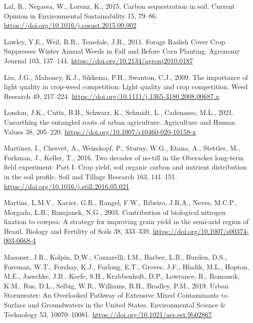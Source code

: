 \documentclass[
  12pt,
]{article}
\newlength{\cslhangindent}
\newlength{\cslentryspacingunit} %
\newenvironment{CSLReferences}[2] %
 {%
  \setlength{\parindent}{0pt}
  \ifodd #1
  \let\oldpar\par
  \def\par{\hangindent=\cslhangindent\oldpar}
  \fi
  \setlength{\parskip}{#2\cslentryspacingunit}
 }%
 {}
\begin{document}
\begin{CSLReferences}{1}{0}
\leavevmode{}%
Lal, R., Negassa, W., Lorenz, K., 2015. Carbon sequestration in soil. Current Opinion in Environmental Sustainability 15, 79--86. \url{https://doi.org/10.1016/j.cosust.2015.09.002}

\leavevmode{}%
Lawley, Y.E., Weil, R.R., Teasdale, J.R., 2011. Forage {Radish Cover Crop Suppresses Winter Annual Weeds} in {Fall} and {Before Corn Planting}. Agronomy Journal 103, 137--144. \url{https://doi.org/10.2134/agronj2010.0187}

\leavevmode{}%
Liu, J.G., Mahoney, K.J., Sikkema, P.H., Swanton, C.J., 2009. The importance of light quality in crop-weed competition: {Light} quality and crop competition. Weed Research 49, 217--224. \url{https://doi.org/10.1111/j.1365-3180.2008.00687.x}

\leavevmode{}%
London, J.K., Cutts, B.B., Schwarz, K., Schmidt, L., Cadenasso, M.L., 2021. Unearthing the entangled roots of urban agriculture. Agriculture and Human Values 38, 205--220. \url{https://doi.org/10.1007/s10460-020-10158-x}

\leavevmode{}%
Martínez, I., Chervet, A., Weisskopf, P., Sturny, W.G., Etana, A., Stettler, M., Forkman, J., Keller, T., 2016. Two decades of no-till in the {Oberacker} long-term field experiment: {Part I}. {Crop} yield, soil organic carbon and nutrient distribution in the soil profile. Soil and Tillage Research 163, 141--151. \url{https://doi.org/10.1016/j.still.2016.05.021}

\leavevmode{}%
Martins, L.M.V., Xavier, G.R., Rangel, F.W., Ribeiro, J.R.A., Neves, M.C.P., Morgado, L.B., Rumjanek, N.G., 2003. Contribution of biological nitrogen fixation to cowpea: A strategy for improving grain yield in the semi-arid region of {Brazil}. Biology and Fertility of Soils 38, 333--339. \url{https://doi.org/10.1007/s00374-003-0668-4}

\leavevmode{}%
Masoner, J.R., Kolpin, D.W., Cozzarelli, I.M., Barber, L.B., Burden, D.S., Foreman, W.T., Forshay, K.J., Furlong, E.T., Groves, J.F., Hladik, M.L., Hopton, M.E., Jaeschke, J.B., Keefe, S.H., Krabbenhoft, D.P., Lowrance, R., Romanok, K.M., Rus, D.L., Selbig, W.R., Williams, B.H., Bradley, P.M., 2019. Urban {Stormwater}: {An Overlooked Pathway} of {Extensive Mixed Contaminants} to {Surface} and {Groundwaters} in the {United States}. Environmental Science \& Technology 53, 10070--10081. \url{https://doi.org/10.1021/acs.est.9b02867}


\end{CSLReferences}
\end{document}
